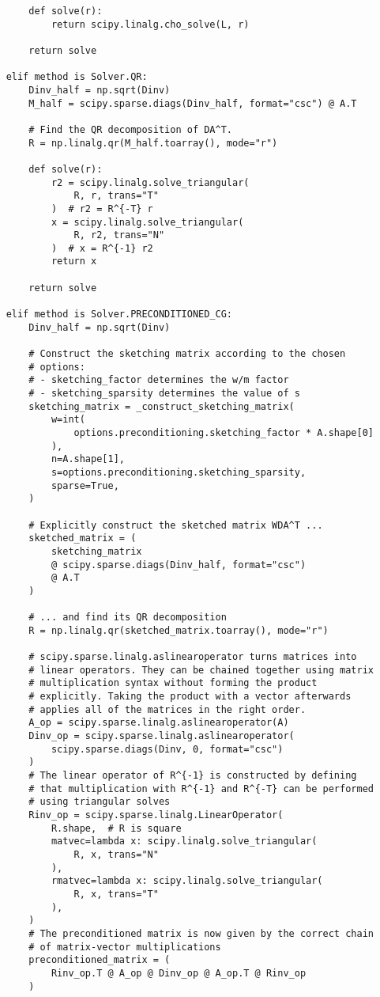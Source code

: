 \begin{verbatim}
        def solve(r):
            return scipy.linalg.cho_solve(L, r)

        return solve

    elif method is Solver.QR:
        Dinv_half = np.sqrt(Dinv)
        M_half = scipy.sparse.diags(Dinv_half, format="csc") @ A.T

        # Find the QR decomposition of DA^T.
        R = np.linalg.qr(M_half.toarray(), mode="r")

        def solve(r):
            r2 = scipy.linalg.solve_triangular(
                R, r, trans="T"
            )  # r2 = R^{-T} r
            x = scipy.linalg.solve_triangular(
                R, r2, trans="N"
            )  # x = R^{-1} r2
            return x

        return solve

    elif method is Solver.PRECONDITIONED_CG:
        Dinv_half = np.sqrt(Dinv)

        # Construct the sketching matrix according to the chosen
        # options:
        # - sketching_factor determines the w/m factor
        # - sketching_sparsity determines the value of s
        sketching_matrix = _construct_sketching_matrix(
            w=int(
                options.preconditioning.sketching_factor * A.shape[0]
            ),
            n=A.shape[1],
            s=options.preconditioning.sketching_sparsity,
            sparse=True,
        )

        # Explicitly construct the sketched matrix WDA^T ...
        sketched_matrix = (
            sketching_matrix
            @ scipy.sparse.diags(Dinv_half, format="csc")
            @ A.T
        )

        # ... and find its QR decomposition
        R = np.linalg.qr(sketched_matrix.toarray(), mode="r")

        # scipy.sparse.linalg.aslinearoperator turns matrices into
        # linear operators. They can be chained together using matrix
        # multiplication syntax without forming the product
        # explicitly. Taking the product with a vector afterwards
        # applies all of the matrices in the right order.
        A_op = scipy.sparse.linalg.aslinearoperator(A)
        Dinv_op = scipy.sparse.linalg.aslinearoperator(
            scipy.sparse.diags(Dinv, 0, format="csc")
        )
        # The linear operator of R^{-1} is constructed by defining
        # that multiplication with R^{-1} and R^{-T} can be performed
        # using triangular solves
        Rinv_op = scipy.sparse.linalg.LinearOperator(
            R.shape,  # R is square
            matvec=lambda x: scipy.linalg.solve_triangular(
                R, x, trans="N"
            ),
            rmatvec=lambda x: scipy.linalg.solve_triangular(
                R, x, trans="T"
            ),
        )
        # The preconditioned matrix is now given by the correct chain
        # of matrix-vector multiplications
        preconditioned_matrix = (
            Rinv_op.T @ A_op @ Dinv_op @ A_op.T @ Rinv_op
        )


\end{verbatim}
